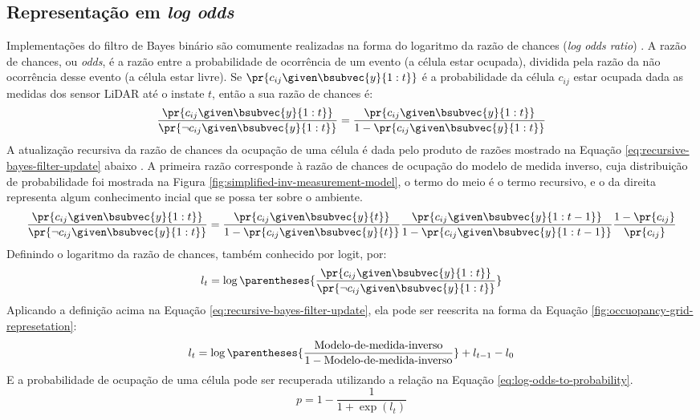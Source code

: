\subsection{Representação em \textit{log odds}}
Implementações do filtro de Bayes binário são comumente realizadas na 
forma do logaritmo da razão de chances (\textit{log odds ratio}) \cite[p.~94]{bongard2006probabilistic}. A razão de chances, ou \textit{odds}, é a 
razão entre a probabilidade de ocorrência de um evento (a célula 
estar ocupada), dividida pela razão da não ocorrência desse evento (a 
célula estar livre). Se $\pr{c_{ij} \given \bsubvec{y}{1:t}}$ é a probabilidade da célula $c_{ij}$ 
estar ocupada dada as medidas dos sensor LiDAR até o instate $t$, então a sua razão de chances é:
\begin{equation}
  \frac{\pr{c_{ij}\given \bsubvec{y}{1:t}}}{\pr{\neg c_{ij}\given \bsubvec{y}{1:t}}} = \frac{\pr{c_{ij}\given \bsubvec{y}{1:t}}}{1 - \pr{c_{ij}\given \bsubvec{y}{1:t}}}
\end{equation}
A atualização recursiva da razão de chances da ocupação de uma célula é 
dada pelo produto de razões mostrado na Equação \ref{eq:recursive-bayes-filter-update} abaixo \cite[p.~96]{bongard2006probabilistic}. A primeira razão corresponde à razão de 
chances de ocupação do modelo de medida inverso, cuja distribuição de 
probabilidade foi mostrada na Figura \ref{fig:simplified-inv-measurement-model}, o termo do meio é o termo 
recursivo, e o da direita representa algum conhecimento incial que se 
possa ter sobre o ambiente.
\begin{equation}
  \frac{\pr{c_{ij}\given \bsubvec{y}{1:t}}}{\pr{\neg c_{ij}\given \bsubvec{y}{1:t}}} = \frac{\pr{c_{ij}\given \bsubvec{y}{t}}}{1 - \pr{c_{ij}\given \bsubvec{y}{t}}} \frac{\pr{c_{ij}\given \bsubvec{y}{1:t-1}}}{1 - \pr{c_{ij}\given \bsubvec{y}{1:t-1}}} \frac{1 - \pr{c_{ij}}}{\pr{c_{ij}}}
  \label{eq:recursive-bayes-filter-update}
\end{equation}
Definindo o logaritmo da razão de chances, também conhecido por logit, por:
\begin{equation}
  l_{t} = \log\parentheses{\frac{\pr{c_{ij}\given \bsubvec{y}{1:t}}}{\pr{\neg c_{ij}\given \bsubvec{y}{1:t}}}}
\end{equation}
Aplicando a definição acima na 
Equação \ref{eq:recursive-bayes-filter-update}, ela pode ser reescrita 
na forma da Equação \ref{fig:occuopancy-grid-represetation}:
\begin{equation}
  l_t = \log\parentheses{\frac{\text{Modelo-de-medida-inverso}}{1 - \text{Modelo-de-medida-inverso}}} + l_{t-1} - l_0
  \label{eq:occupancy-grid-log-odds}
\end{equation}
E a probabilidade de ocupação de uma célula pode ser recuperada 
utilizando a relação na Equação \ref{eq:log-odds-to-probability}.
\begin{equation}
  p = 1 - \frac{1}{1 + \exp({l_t})}
  \label{eq:log-odds-to-probability}
\end{equation}

